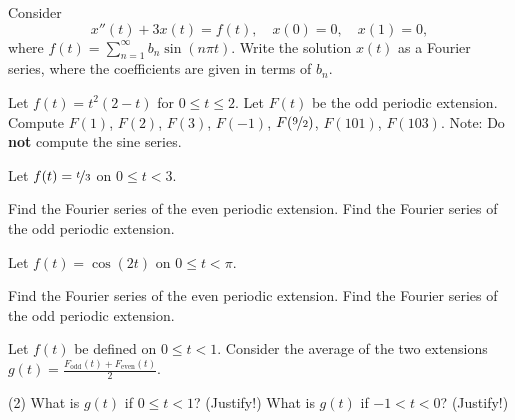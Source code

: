 \begin{exercise}
Consider
\begin{equation*}
x''(t) + 3 x(t) = f(t) , \quad x(0) = 0, \quad x(1) = 0,
\end{equation*}
where $f(t) = \sum_{n=1}^\infty b_n \sin (n \pi t)$.  Write the solution $x(t)$
as a Fourier series, where the coefficients are given in terms of $b_n$.
\end{exercise}

\begin{exercise}
Let $f(t) = t^2(2-t)$ for $0 \leq t \leq 2$.  Let $F(t)$ be the odd periodic
extension.  Compute $F(1)$, $F(2)$, $F(3)$, $F(-1)$, $F(\nicefrac{9}{2})$,
$F(101)$, $F(103)$.  Note: Do \textbf{not} compute the sine series.
\end{exercise}

\setcounter{exercise}{100}

\begin{exercise}
Let $f(t) = \nicefrac{t}{3}$ on $0 \leq t < 3$.
\begin{tasks}
\task Find the Fourier series of the even periodic extension.
\task Find the Fourier series of the odd periodic extension.
\end{tasks}
\end{exercise}

\begin{exercise}
Let $f(t) = \cos(2t)$ on $0 \leq t < \pi$.
\begin{tasks}
\task Find the Fourier series of the even periodic extension.
\task Find the Fourier series of the odd periodic extension.
\end{tasks}
\end{exercise}

\begin{exercise}
Let $f(t)$ be defined on $0 \leq t < 1$.  Consider
the average of the two extensions
$g(t) = \frac{F_{\text{odd}}(t)+ F_{\text{even}}(t)}{2}$.
\begin{tasks}(2)
\task What is $g(t)$ if $0 \leq t < 1$? (Justify!)
\task What is $g(t)$ if $-1 < t < 0$? (Justify!)
\end{tasks}
\end{exercise}

